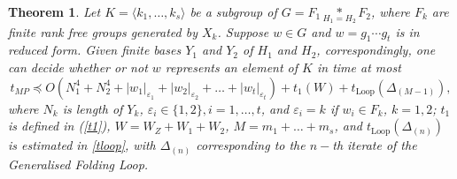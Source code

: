 \documentclass[a4paper,12pt]{article}
\newcommand{\D}{\Delta }
\newcommand{\e}{\varepsilon }
\newtheorem{theorem}{Theorem}[section]
\numberwithin{equation}{section}
\numberwithin{figure}{section}
\newcommand{\Loop}{\operatorname{Loop}}
\newcommand{\la}{\langle}
\newcommand{\ra}{\rangle}
\begin{document}
\begin{theorem}\label{th:complexity} Let $K=\la k_1, \ldots , k_s\ra$ be a subgroup of $G = F_1 \underset{H_1=H_2}{\ast} F_2$, where $F_k$ are finite rank free groups generated by $X_k$.
 Suppose $w \in G$ and $w=g_1 \cdots g_t$ is in reduced
form. Given finite bases $Y_1$ and $Y_2$ of $H_1$ and $H_2$, correspondingly, one can decide whether or not $w$ represents an element of $K$ in time at most 
\begin{equation}\label{eq:alg_compl} t_{MP} \preceq O(N_1^4 + N_2^4+ |w_1|_{\e_1}+|w_2|_{\e_2}+
\ldots +|w_t|_{\e_t})+ t_1(W)+t_{\Loop}(\D_{(M-1)}),
\end{equation}
where $N_k$ is length of $Y_k$, $\e_i \in \{ 1, 2\}, i = 1, \ldots,
t$, and $\e_i = k$ if $w_i \in F_k$, $k = 1,2$; $t_1$ is defined in (\ref{t1}), $W = W_Z +W_1 +W_2$, $M = m_1 + \ldots + m_s$, and $t_{\Loop}(\D_{(n)})$ is estimated in \eqref{tloop}, with $\D_{(n)}$ corresponding to the $n-$th iterate of the Generalised Folding Loop.
\end{theorem}
\end{document}
